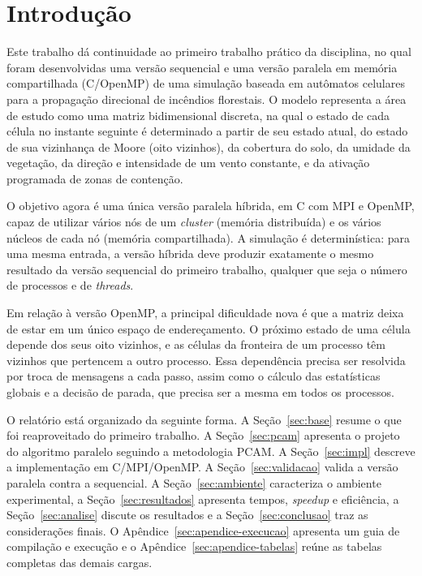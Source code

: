 \documentclass[11pt,a4paper]{article}
\begin{document}
\section{Introdução}
\label{sec:intro}

Este trabalho dá continuidade ao primeiro trabalho prático da disciplina, no qual foram desenvolvidas uma versão sequencial e uma versão paralela em memória compartilhada (C/OpenMP) de uma simulação baseada em autômatos celulares para a propagação direcional de incêndios florestais. O modelo representa a área de estudo como uma matriz bidimensional discreta, na qual o estado de cada célula no instante seguinte é determinado a partir de seu estado atual, do estado de sua vizinhança de Moore (oito vizinhos), da cobertura do solo, da umidade da vegetação, da direção e intensidade de um vento constante, e da ativação programada de zonas de contenção.

O objetivo agora é uma única versão paralela híbrida, em C com MPI e OpenMP, capaz de utilizar vários nós de um \emph{cluster} (memória distribuída) e os vários núcleos de cada nó (memória compartilhada). A simulação é determinística: para uma mesma entrada, a versão híbrida deve produzir exatamente o mesmo resultado da versão sequencial do primeiro trabalho, qualquer que seja o número de processos e de \emph{threads}.

Em relação à versão OpenMP, a principal dificuldade nova é que a matriz deixa de estar em um único espaço de endereçamento. O próximo estado de uma célula depende dos seus oito vizinhos, e as células da fronteira de um processo têm vizinhos que pertencem a outro processo. Essa dependência precisa ser resolvida por troca de mensagens a cada passo, assim como o cálculo das estatísticas globais e a decisão de parada, que precisa ser a mesma em todos os processos.

O relatório está organizado da seguinte forma. A Seção~\ref{sec:base} resume o que foi reaproveitado do primeiro trabalho. A Seção~\ref{sec:pcam} apresenta o projeto do algoritmo paralelo seguindo a metodologia PCAM. A Seção~\ref{sec:impl} descreve a implementação em C/MPI/OpenMP. A Seção~\ref{sec:validacao} valida a versão paralela contra a sequencial. A Seção~\ref{sec:ambiente} caracteriza o ambiente experimental, a Seção~\ref{sec:resultados} apresenta tempos, \emph{speedup} e eficiência, a Seção~\ref{sec:analise} discute os resultados e a Seção~\ref{sec:conclusao} traz as considerações finais. O Apêndice~\ref{sec:apendice-execucao} apresenta um guia de compilação e execução e o Apêndice~\ref{sec:apendice-tabelas} reúne as tabelas completas das demais cargas.
\end{document}
